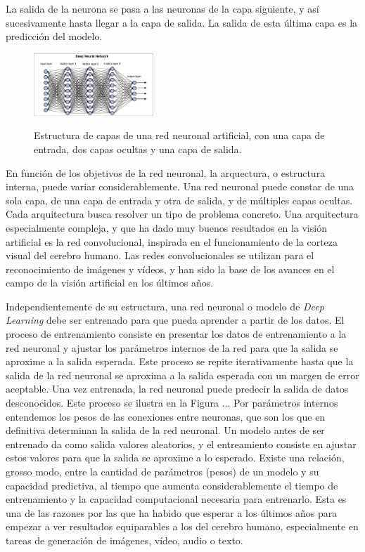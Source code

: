La salida de la neurona se pasa a las neuronas de la capa siguiente, y así sucesivamente hasta llegar a la capa de salida. La salida de esta última capa es la predicción del modelo. 

\begin{figure}[H]
    \caption[Estructura de capas de una red neuronal artificial]{Estructura de capas de una red neuronal artificial, con una capa de entrada, dos capas ocultas y una capa de salida.}
    \centering
    \includegraphics[width=0.4\textwidth]{./figuras/Deep_neural_network.png}
    \label{fig:deep_neural_network}
\end{figure}

En función de los objetivos de la red neuronal, la arquectura, o estructura interna, puede variar considerablemente. Una red neuronal puede constar de una sola capa, de una capa de entrada y otra de salida, y de múltiples capas ocultas. Cada arquitectura busca resolver un tipo de problema concreto. Una arquitectura especialmente compleja, y que ha dado muy buenos resultados en la visión artificial es la red convolucional, inspirada en el funcionamiento de la corteza visual del cerebro humano. Las redes convolucionales se utilizan para el reconocimiento de imágenes y vídeos, y han sido la base de los avances en el campo de la visión artificial en los últimos años.

Independientemente de su estructura, una red neuronal o modelo de \textit{Deep Learning} debe ser entrenado para que pueda aprender a partir de los datos. El proceso de entrenamiento consiste en presentar los datos de entrenamiento a la red neuronal y ajustar los parámetros internos de la red para que la salida se aproxime a la salida esperada. Este proceso se repite iterativamente hasta que la salida de la red neuronal se aproxima a la salida esperada con un margen de error aceptable. Una vez entrenada, la red neuronal puede predecir la salida de datos desconocidos. Este proceso se ilustra en la Figura ... Por parámetros internos entendemos los pesos de las conexiones entre neuronas, que son los que en definitiva determinan la salida de la red neuronal. Un modelo antes de ser entrenado da como salida valores aleatorios, y el entreamiento consiste en ajustar estos valores para que la salida se aproxime a lo esperado. Existe una relación, grosso modo, entre la cantidad de parámetros (pesos) de un modelo y su capacidad predictiva, al tiempo que aumenta considerablemente el tiempo de entrenamiento y la capacidad computacional necesaria para entrenarlo. Esta es una de las razones por las que ha habido que esperar a los últimos años para empezar a ver resultados equiparables a los del cerebro humano, especialmente en tareas de generación de imágenes, vídeo, audio o texto.

